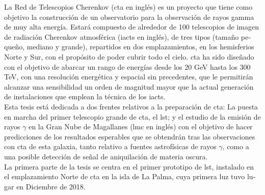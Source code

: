 \documentclass[main.tex]{subfiles}
\begin{document}
\glsresetall
\begin{otherlanguage}{spanish}
La Red de Telescopios Cherenkov (\gls{cta} en inglés) es un proyecto que tiene como objetivo la construcción de un observatorio para la observación de rayos gamma de muy alta energía. Estará compuesto de alrededor de 100 telescopios de imagen de radiación Cherenkov atmosférica (\glspl{iact} en inglés), de tres tipos (tamaño pequeño, mediano y grande), repartidos en dos emplazamientos, en los hemisferios Norte y Sur, con el propósito de poder cubrir todo el cielo. \gls{cta} ha sido diseñado con el objetivo de abarcar un rango de energías desde los 20 GeV hasta los 300 TeV, con una resolución energética y espacial sin precedentes,  que le permitirán alcanzar una sensibilidad un orden de magnitud mayor que la actual generación de instalaciones que emplean la técnica de los \glspl{iact}.\\
Esta tesis está dedicada a dos frentes relativos a la preparación de \gls{cta}: La puesta en marcha del primer telescopio grande de \gls{cta}, el \gls{lst}; y el estudio de la emisión de rayos $\gamma$ en la Gran Nube de Magallanes (\gls{lmc} en inglés) con el objetivo de hacer predicciones de los resultados esperables que se obtendrán tras las observaciones con \gls{cta} de esta galaxia, tanto relativo a fuentes astrofísicas de rayos $\gamma$, como a una posible detección de señal de aniquilación de materia oscura.\\   
La primera parte de la tesis se centra en el primer prototipo de \gls{lst}, instalado en el emplazamiento Norte de \gls{cta} en la isla de La Palma, cuya primera luz tuvo lugar en Diciembre de 2018.

\end{otherlanguage}
\end{document}
